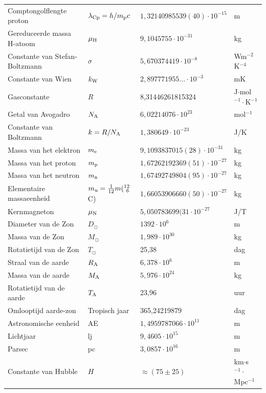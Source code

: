 \documentclass[twoside]{report}
\begin{document}
\begin{center}
\begin{tabular}{||l|lll||}
Comptongolflengte proton       &$\lambda_{\rm Cp}=h/m_{\rm p}c$&$1,32140985539(40)\cdot10^{-15}$&m\\
Gereduceerde massa H-atoom     &$\mu_{\rm H}$&$9,1045755\cdot10^{-31}$&kg\\
\hline
Constante van Stefan-Boltzmann &$\sigma$&$5,670374419\cdot10^{-8}$&Wm$^{-2}$K$^{-4}$\rule{0pt}{13pt}\\
Constante van Wien             &$k_{\rm W}$&$2,897771955...\cdot10^{-3}$&mK\\
\hline
Gasconstante                   &$R$&8,31446261815324&J$\cdot$mol$^{-1}\cdot$K$^{-1}$\\
Getal van Avogadro             &$N_{\rm A}$&$6,02214076\cdot10^{23}$&mol$^{-1}$\\
Constante van Boltzmann        &$k=R/N_{\rm A}$&$1,380649\cdot10^{-23}$&J/K\\
\hline
Massa van het elektron         &$m_{\rm e}$&$9,1093837015(28)\cdot10^{-31}$&kg\rule{0pt}{13pt}\\
Massa van het proton           &$m_{\rm p}$&$1,67262192369(51)\cdot10^{-27}$&kg\\
Massa van het neutron          &$m_{\rm n}$&$1,67492749804(95)\cdot10^{-27}$&kg\\
Elementaire massaeenheid       &$m_{\rm u}=\frac{1}{12}m(^{12}_{~6}$C)&$1,66053906660(50)\cdot10^{-27}$&kg\\
Kernmagneton                   &$\mu_{\rm N}$&$5,050783699(31\cdot10^{-27}$&J/T\\
\hline
Diameter van de Zon            &$D_\odot$&$1392\cdot10^6$&m\rule{0pt}{13pt}\\
Massa van de Zon               &$M_\odot$&$1,989\cdot10^{30}$&kg\\
Rotatietijd van de Zon         &$T_\odot$&25,38&dag\\
Straal van de aarde            &$R_{\rm A}$&$6,378\cdot10^6$&m\\
Massa van de aarde             &$M_{\rm A}$&$5,976\cdot10^{24}$&kg\\
Rotatietijd van de aarde       &$T_{\rm A}$&23,96&uur\\
Omlooptijd aarde-zon           &Tropisch jaar&365,24219879&dag\\
Astronomische eenheid          &AE&$1,4959787066\cdot10^{11}$&m\\
Lichtjaar                      &lj&$9,4605\cdot10^{15}$&m\\
Parsec                         &pc&$3,0857\cdot10^{16}$&m\\
Constante van Hubble           &$H$&$\approx(75\pm25)$&km$\cdot$s$^{-1}\cdot$Mpc$^{-1}$\\
\hline
\end{tabular}
\end{center}
\end{document}
